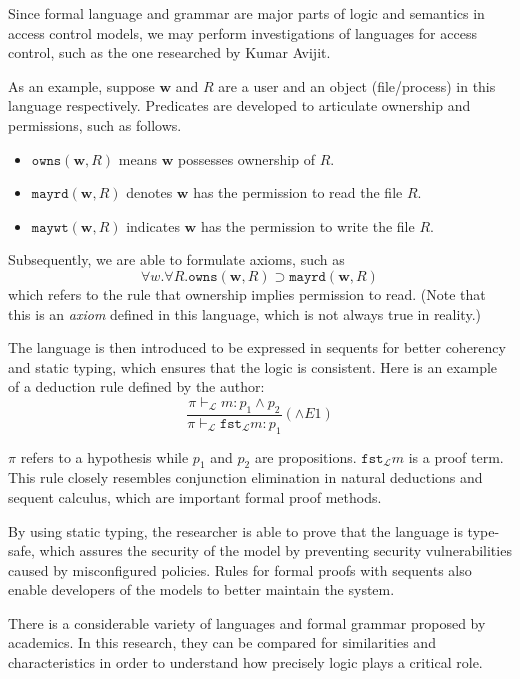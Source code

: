 \documentclass{article}
\begin{document}
Since formal language and grammar are major parts of logic and semantics in
access control models, we may perform investigations of languages for access
control, such as the one researched by Kumar Avijit.\cite{language}

As an example, suppose $\mathbf{w}$ and $R$ are a user and an object
(file/process) in this language respectively. Predicates are developed to
articulate ownership and permissions, such as follows.  \begin{itemize}
    \item $\texttt{owns}(\mathbf{w},R)$ means $\mathbf{w}$ possesses ownership
    of $R$.  \item $\texttt{mayrd}(\mathbf{w},R)$ denotes $\mathbf{w}$ has
    the permission to read the file $R$.  \item $\texttt{maywt}(\mathbf{w},R)$
    indicates $\mathbf{w}$ has the permission to write the file $R$.
\end{itemize}

Subsequently, we are able to formulate axioms, such as $$\forall w . \forall
R . \texttt{owns}(\mathbf{w},R) \supset \texttt{mayrd}(\mathbf{w},R)$$
which refers to the rule that ownership implies permission to read. (Note
that this is an \textit{axiom} defined in this language, which is not always
true in reality.)

The language is then introduced to be expressed in sequents for better
coherency and static typing, which ensures that the logic is consistent. Here
is an example of a deduction rule defined by the author: $$\frac{\pi
\vdash_{\mathcal{L}} m : p_{1} \land p_{2}}{\pi \vdash_{\mathcal{L}}
\texttt{fst}_{\mathcal{L}} m : p_{1}}(\land E1)$$

$\pi$ refers to a hypothesis while $p_{1}$ and $p_{2}$ are
propositions. $\texttt{fst}_{\mathcal{L}} m$ is a proof term. This rule
closely resembles conjunction elimination in natural deductions and sequent
calculus, which are important formal proof methods.

By using static typing, the researcher is able to prove that the language is
type-safe, which assures the security of the model by preventing security
vulnerabilities caused by misconfigured policies. Rules for formal proofs
with sequents also enable developers of the models to better maintain the
system.\cite{language}

There is a considerable variety of languages and formal grammar proposed
by academics. In this research, they can be compared for similarities and
characteristics in order to understand how precisely logic plays a critical
role.
\end{document}
